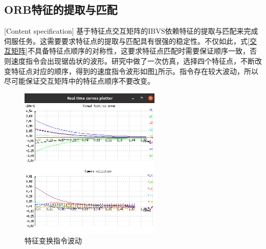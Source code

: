 \documentclass[fontset=fandol,type=bachelor,campus=harbin,bsmainpagenumberline=true]{hithesisbook}
\begin{document}
\subsection{ORB特征的提取与匹配}[Content specification]
基于特征点交互矩阵的IBVS依赖特征的提取与匹配来完成伺服任务。这需要要求特征点的提取与匹配具有很强的稳定性。不仅如此，式\ref{交互矩阵}不具备特征点顺序的对称性，这要求特征点匹配时需要保证顺序一致，否则速度指令会出现锯齿状的波形。研究中做了一次仿真，选择四个特征点，不断改变特征点对应的顺序，得到的速度指令波形如图\ref{特征变换指令波动}所示。指令存在较大波动，所以尽可能保证交互矩阵中的特征点顺序不要改变。
\begin{figure}[h]
\centering
\includegraphics[width = 0.6\textwidth]{chapter4/特征变换指令波动}
\caption{特征变换指令波动}
\label{特征变换指令波动}
\end{figure}
\end{document}
